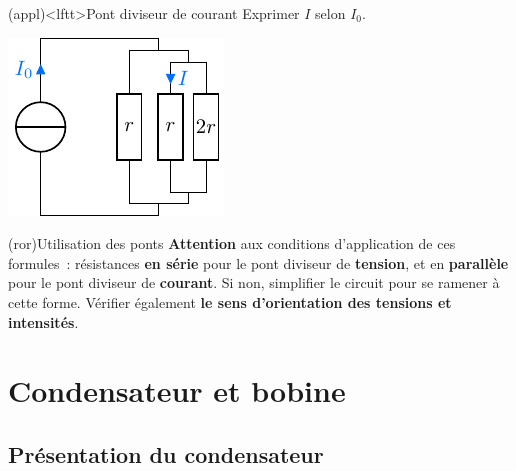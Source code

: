 \documentclass[../../main/main.tex]{subfiles}
\begin{document}
\begin{tcb*}[breakable, sidebyside, lefthand ratio=.3](appl)<lftt>{Pont diviseur de courant}
	Exprimer $I$ selon $I_0$.
	\begin{center}
		\includegraphics[scale=1]{divcour_last-plain}
	\end{center}
	\tcblower
	\begin{isd}
		\tcblower
	\end{isd}
\end{tcb*}

\begin{tcb*}[label=impo:ponts](ror){Utilisation des ponts}
	\textbf{Attention} aux conditions d'application de ces formules~: résistances
	\textbf{en série} pour le pont diviseur de \textbf{tension}, et en
	\textbf{parallèle} pour le pont diviseur de \textbf{courant}.
	\smallbreak
	Si non, simplifier le circuit pour se ramener à cette forme. Vérifier
	également \textbf{le sens d'orientation des tensions et intensités}.
\end{tcb*}

\section{Condensateur et bobine}
\subsection{Présentation du condensateur}
\end{document}
